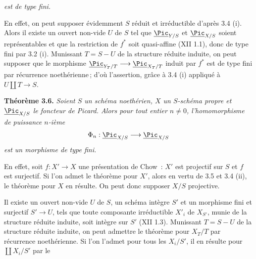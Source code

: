 
\emph{est de type fini.}

En effet, on peut supposer \'evidemment \(S\) r\'eduit et irr\'eductible d'apr\`es 3.4 (i). Alors il existe un ouvert non-vide \(U\) de \(S\) tel que \(\underline{\Pic}_{Y/S}\) et \(\underline{\Pic}_{X/S}\) soient repr\'esentables et que la restriction de \(f^*\) soit quasi-affine (XII 1.1), donc de type fini par 3.2 (i). Munissant \(T=S-U\) de la structure r\'eduite induite, on peut supposer que le morphisme \(\underline{\Pic}_{Y_T/T}\longrightarrow\underline{\Pic}_{X_T/T}\) induit par \(f^*\) est de type fini par r\'ecurrence noeth\'erienne\,; d'o\`u l'assertion, gr\^ace \`a 3.4 (i) appliqu\'e \`a \(U\amalg T\to S\).

\textbf{Th\'eor\`eme 3.6.} \emph{Soient \(S\) un sch\'ema noeth\'erien, \(X\) un \(S\)-sch\'ema propre et \(\underline{\Pic}_{X/S}\) le foncteur de Picard. Alors pour tout entier \(n\ne0\), l'homomorphisme de puissance \(n\)-i\`eme}
\[
\Phi_n:\underline{\Pic}_{X/S}\longrightarrow\underline{\Pic}_{X/S}
\]
\emph{est un morphisme de type fini.}

En effet, soit \(f:X'\to X\) une pr\'esentation de Chow~: \(X'\) est projectif sur \(S\) et \(f\) est surjectif. Si l'on admet le th\'eor\`eme pour \(X'\), alors en vertu de 3.5 et 3.4 (ii), le th\'eor\`eme pour \(X\) en r\'esulte. On peut donc supposer \(X/S\) projective.

Il existe un ouvert non-vide \(U\) de \(S\), un sch\'ema int\`egre \(S'\) et un morphisme fini et surjectif \(S'\to U\), tels que toute composante irr\'eductible \(X'_i\) de \(X_{S'}\), munie de la structure r\'eduite induite, soit int\`egre sur \(S'\) (XII 1.3). Munissant \(T=S-U\) de la structure r\'eduite induite, on peut admettre le th\'eor\`eme pour \(X_T/T\) par r\'ecurrence noeth\'erienne. Si l'on l'admet pour tous les \(X_i/S'\), il en r\'esulte pour \(\coprod X_i/S'\) par le
